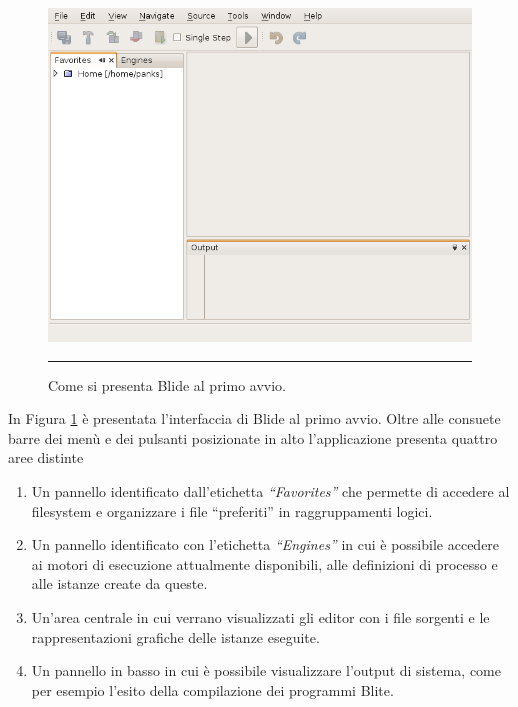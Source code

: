 \begin{figure}[t!]
\begin{center}
\includegraphics[scale=0.60]
{blide/dia/Blide1}
\caption[Blide Schermata]{Come si presenta Blide al primo avvio.}
\rule{7cm}{0.01cm}
  \label{fig:blide1}
\end{center}
\end{figure}
 
In Figura \ref{fig:blide1} è presentata l'interfaccia di Blide al primo avvio. 
Oltre alle consuete barre dei menù e dei pulsanti posizionate in alto
l'applicazione presenta quattro aree distinte

\begin{enumerate}
  \item Un pannello identificato dall'etichetta \emph{``Favorites''} che
  permette di accedere al filesystem e organizzare i file ``preferiti''
  in raggruppamenti logici.
  \item Un pannello identificato con l'etichetta \emph{``Engines''} in cui è
  possibile accedere ai motori di esecuzione attualmente disponibili, alle
  definizioni di processo e alle istanze create da queste.
  \item Un'area centrale in cui verrano visualizzati gli editor con i file
  sorgenti e le rappresentazioni grafiche delle istanze eseguite.
  \item Un pannello in basso in cui è possibile visualizzare l'output di
  sistema, come per esempio l'esito della compilazione dei programmi Blite.
\end{enumerate}

